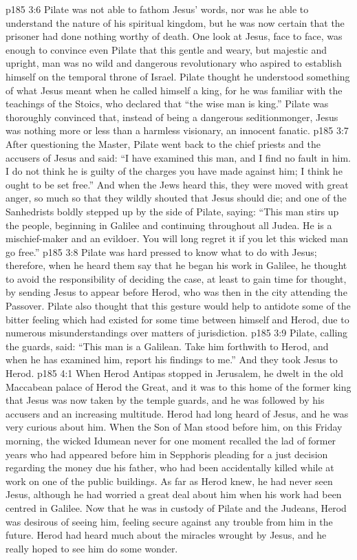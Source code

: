\vs p185 3:6 Pilate was not able to fathom Jesus’ words, nor was he able to understand the nature of his spiritual kingdom, but he was now certain that the prisoner had done nothing worthy of death. One look at Jesus, face to face, was enough to convince even Pilate that this gentle and weary, but majestic and upright, man was no wild and dangerous revolutionary who aspired to establish himself on the temporal throne of Israel. Pilate thought he understood something of what Jesus meant when he called himself a king, for he was familiar with the teachings of the Stoics, who declared that “the wise man is king.” Pilate was thoroughly convinced that, instead of being a dangerous seditionmonger, Jesus was nothing more or less than a harmless visionary, an innocent fanatic.
\vs p185 3:7 After questioning the Master, Pilate went back to the chief priests and the accusers of Jesus and said: “I have examined this man, and I find no fault in him. I do not think he is guilty of the charges you have made against him; I think he ought to be set free.” And when the Jews heard this, they were moved with great anger, so much so that they wildly shouted that Jesus should die; and one of the Sanhedrists boldly stepped up by the side of Pilate, saying: “This man stirs up the people, beginning in Galilee and continuing throughout all Judea. He is a mischief\hyp{}maker and an evildoer. You will long regret it if you let this wicked man go free.”
\vs p185 3:8 Pilate was hard pressed to know what to do with Jesus; therefore, when he heard them say that he began his work in Galilee, he thought to avoid the responsibility of deciding the case, at least to gain time for thought, by sending Jesus to appear before Herod, who was then in the city attending the Passover. Pilate also thought that this gesture would help to antidote some of the bitter feeling which had existed for some time between himself and Herod, due to numerous misunderstandings over matters of jurisdiction.
\vs p185 3:9 Pilate, calling the guards, said: “This man is a Galilean. Take him forthwith to Herod, and when he has examined him, report his findings to me.” And they took Jesus to Herod.
\vs p185 4:1 When Herod Antipas stopped in Jerusalem, he dwelt in the old Maccabean palace of Herod the Great, and it was to this home of the former king that Jesus was now taken by the temple guards, and he was followed by his accusers and an increasing multitude. Herod had long heard of Jesus, and he was very curious about him. When the Son of Man stood before him, on this Friday morning, the wicked Idumean never for one moment recalled the lad of former years who had appeared before him in Sepphoris pleading for a just decision regarding the money due his father, who had been accidentally killed while at work on one of the public buildings. As far as Herod knew, he had never seen Jesus, although he had worried a great deal about him when his work had been centred in Galilee. Now that he was in custody of Pilate and the Judeans, Herod was desirous of seeing him, feeling secure against any trouble from him in the future. Herod had heard much about the miracles wrought by Jesus, and he really hoped to see him do some wonder.
